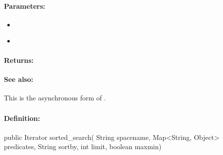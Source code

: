 \paragraph{Parameters:}
\begin{itemize}[noitemsep]
\item {}\\

\item {}\\

\end{itemize}

\paragraph{Returns:}


\paragraph{See also:}  This is the asynchronous form of .

\pagebreak
\subsubsection{}
\label{api:java:sorted_search}


\paragraph{Definition:}
\begin{javacode}
public Iterator sorted_search(
        String spacename,
        Map<String, Object> predicates,
        String sortby,
        int limit,
        boolean maxmin)
\end{javacode}

